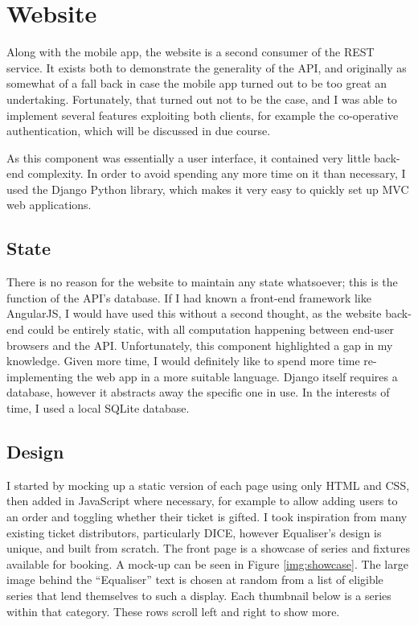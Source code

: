 \documentclass[12pt,a4paper]{bhamdissertation}
\begin{document}
\section{Website}

Along with the mobile app, the website is a second consumer of the REST service. It exists both to demonstrate the generality of the API, and originally as somewhat of a fall back in case the mobile app turned out to be too great an undertaking. Fortunately, that turned out not to be the case, and I was able to implement several features exploiting both clients, for example the co-operative authentication, which will be discussed in due course.

As this component was essentially a user interface, it contained very little back-end complexity. In order to avoid spending any more time on it than necessary, I used the Django Python library, which makes it very easy to quickly set up MVC web applications.

\subsection{State}

There is no reason for the website to maintain any state whatsoever; this is the function of the API's database. If I had known a front-end framework like AngularJS, I would have used this without a second thought, as the website back-end could be entirely static, with all computation happening between end-user browsers and the API. Unfortunately, this component highlighted a gap in my knowledge. Given more time, I would definitely like to spend more time re-implementing the web app in a more suitable language. Django itself requires a database, however it abstracts away the specific one in use. In the interests of time, I used a local SQLite database.

\subsection{Design}

I started by mocking up a static version of each page using only HTML and CSS, then added in JavaScript where necessary, for example to allow adding users to an order and toggling whether their ticket is gifted. I took inspiration from many existing ticket distributors, particularly DICE, however Equaliser's design is unique, and built from scratch. The front page is a showcase of series and fixtures available for booking. A mock-up can be seen in Figure \ref{img:showcase}. The large image behind the ``Equaliser'' text is chosen at random from a list of eligible series that lend themselves to such a display. Each thumbnail below is a series within that category. These rows scroll left and right to show more.
\end{document}
